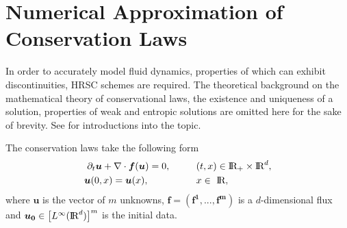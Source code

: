 



%
%
%


\section{Numerical Approximation of Conservation Laws}\label{sec:theory:num_meth}

In order to accurately model fluid dynamics, properties of which can exhibit 
discontinuities, \ac{HRSC} schemes are required.
The theoretical background on the mathematical theory of conservational laws,
the existence and uniqueness of a solution, properties of weak and entropic solutions 
are omitted here for the sake of brevity.
See \citet{LeVeque:1992,Tadmor:1998,Chen:2006} for introductions into the topic.

The conservation laws take the following form 
%
\begin{align}
    \partial_t\boldsymbol{u} + \nabla\cdot\boldsymbol{f}(\boldsymbol{u}) = 0, \hspace{10mm} &(t,x)\in \text{I\!R}_{+}\times\text{I\!R}^d , \\
    \boldsymbol{u}(0, x) = \boldsymbol{u}(x), \hspace{18mm} &x\in \text{ I\!R},
    \label{eq:theory:conservlaws}
\end{align}
%
where $\boldsymbol{u}$ is the vector of $m$ unknowns, $\boldsymbol{f}=(\boldsymbol{\boldsymbol{f}^1,...,\boldsymbol{f}^m})$ is a $d$-dimensional flux and $\boldsymbol{u_0}\in\big[L^{\infty}(\text{I\!R}^d)\big]^m$ is the initial data. 

